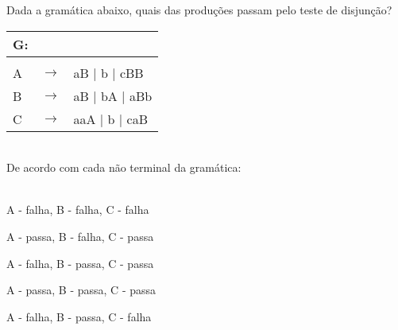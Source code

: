 \question[10] 

Dada a gramática abaixo, quais das produções passam pelo teste de disjunção?\\
\begin{tabular}{|l c l}
	G: & & \\
	\hline \\
	A & $\rightarrow$ & aB | b | cBB \\
    B & $\rightarrow$ & aB | bA | aBb \\
	C & $\rightarrow$ & aaA | b | caB \\
\end{tabular}
\\
De acordo com cada não terminal da gramática:\\
\\
\begin{choices}
\item A - falha, B - falha, C - falha
\item A - passa, B - falha, C - passa %
\item A - falha, B - passa, C - passa
\item A - passa, B - passa, C - passa
\item A - falha, B - passa, C - falha
\end{choices}
\answerline

